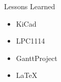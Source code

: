\documentclass{beamer}
\begin{document}
\begin{frame}{Lessons Learned}
  \begin{itemize}
    \pause
  \item KiCad
    \pause
  \item LPC1114
    \pause
  \item GanttProject
    \pause
  \item \LaTeX
    \end{itemize}
\end{frame}
\end{document}
